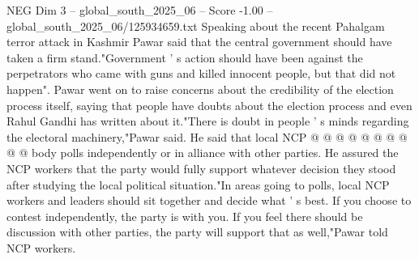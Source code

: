\begin{textsample}{NEG Dim 3 – global\_south\_2025\_06 – Score -1.00 – global\_south\_2025\_06/125934659.txt}
Speaking about the recent Pahalgam terror attack in Kashmir Pawar said that the central government should have taken a firm stand."Government ' s action should have been against the perpetrators who came with guns and killed innocent people, but that did not happen".
Pawar went on to raise concerns about the credibility of the election process itself, saying that people have doubts about the election process and even Rahul Gandhi has written about it."There is doubt in people ' s minds regarding the electoral machinery,"Pawar said.
He said that local NCP @ @ @ @ @ @ @ @ @ @ body polls independently or in alliance with other parties.
He assured the NCP workers that the party would fully support whatever decision they stood after studying the local political situation."In areas going to polls, local NCP workers and leaders should sit together and decide what ' s best.
If you choose to contest independently, the party is with you.
If you feel there should be discussion with other parties, the party will support that as well,"Pawar told NCP workers.

\end{textsample}

